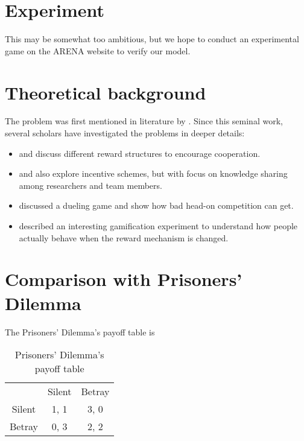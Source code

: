 \documentclass[11pt, a4paper]{article}
\begin{document}
\section{Experiment}
This may be somewhat too ambitious, but we hope to conduct an experimental game on the ARENA website to verify our model.

\section{Theoretical background}
The problem was first mentioned in literature by \cite{Drago1991}. Since this seminal work, several scholars have investigated the problems in deeper details:
\begin{itemize}
	\item \cite{Drago1998} and \cite{Kistruck2016} discuss different reward structures to encourage cooperation.
	\item \cite{Banerjee2014} and \cite{Chakravarti2015} also explore incentive schemes, but with focus on knowledge sharing among researchers and team members.
	\item \cite{Immorlica2011} discussed a dueling game and show how bad head-on competition can get.
	\item \cite{Landers2015} described an interesting gamification experiment to understand how people actually behave when the reward mechanism is changed.
	
\end{itemize}
 
\section{Comparison with Prisoners' Dilemma}
The Prisoners' Dilemma's payoff table is 
\begin{table}[h]
	\centering
	\caption{Prisoners' Dilemma's payoff table}
	\begin{tabular}{c c c}
		        & Silent & Betray \\
		Silent  & 1, 1    & 3, 0     \\
		Betray  & 0, 3    & 2, 2
	\end{tabular}
\end{table}
\end{document}

